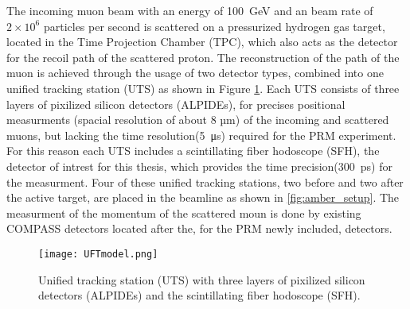 The incoming muon beam with an energy of \SI{100} {\giga\electronvolt}\autocite{ProposalAmber} and an beam rate of $2 \times 10^6$\autocite{ConfrancePaperDAQ} particles per second is scattered on a pressurized hydrogen gas target,
located in the Time Projection Chamber (TPC), 
which also acts as the detector for the recoil path of the scattered proton.
\newline
The reconstruction of the path of the muon is achieved through the usage of two detector types,
 combined into one unified tracking station (UTS) as shown in Figure \ref{UTSpicture}.
\newline
Each UTS consists of three layers of pixilized silicon detectors (ALPIDEs), for precises positional measurments (spacial resolution of about 8 µm\autocite{Amber2022Status}) of the incoming and scattered muons, 
but lacking the time resolution(\SI{5} {\micro\second}\autocite{Amber2022Status}) required for the PRM experiment.
For this reason each UTS includes a scintillating fiber hodoscope (SFH), the detector of intrest for this thesis,
 which provides the time precision(\SI{300} {\pico\second}\Autocite{Amber2022Status}) for the measurment.
 \newline
Four of these unified tracking stations, two before and two after the active target, are placed in the beamline as shown in \ref{fig:amber_setup}.
The measurment of the momentum of the scattered moun is done by existing COMPASS detectors located after the, 
for the PRM newly included, detectors\autocite{ProposalAmber}.

\begin{figure}[H]	
	\centering
	\texttt{[image: UFTmodel.png]}
	\caption{Unified tracking station (UTS) with three layers of pixilized silicon detectors (ALPIDEs) and the scintillating fiber hodoscope (SFH).\autocite{InternalcommunicationKarl}}
	\label{UTSpicture}
\end{figure}
